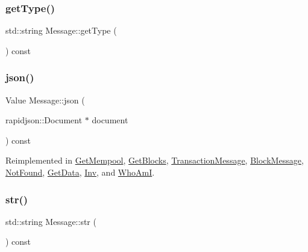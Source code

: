 \subsubsection{\texorpdfstring{get\+Type()}{getType()}}
{\footnotesize\ttfamily std\+::string Message\+::get\+Type (\begin{DoxyParamCaption}{ }\end{DoxyParamCaption}) const}

\mbox{\label{classMessage_a6f8e3ac2eed3a8afe9400fcd5b3447b2}} 
\subsubsection{\texorpdfstring{json()}{json()}}
{\footnotesize\ttfamily Value Message\+::json (\begin{DoxyParamCaption}\item[{rapidjson\+::\+Document $\ast$}]{document }\end{DoxyParamCaption}) const\hspace{0.3cm}{\ttfamily [virtual]}}



Reimplemented in \mbox{\hyperlink{classGetMempool_a3e6fb495c609ade4e8efd3d5668c28cf}{Get\+Mempool}}, \mbox{\hyperlink{classGetBlocks_a8b77916e999ba0a730e31b90b4733928}{Get\+Blocks}}, \mbox{\hyperlink{classTransactionMessage_af8675087bd26b6aa0c30a3e3141dda4e}{Transaction\+Message}}, \mbox{\hyperlink{classBlockMessage_afe33ddfdae83a25d98dd28541bc2fcfe}{Block\+Message}}, \mbox{\hyperlink{classNotFound_a67ee661e6a87c681d167da585c106240}{Not\+Found}}, \mbox{\hyperlink{classGetData_a2fb121264fc1c5821e769f4f2389c6ff}{Get\+Data}}, \mbox{\hyperlink{classInv_a815854f9808009dbf9f0fdb1159061c5}{Inv}}, and \mbox{\hyperlink{classWhoAmI_a998c4b21d6235a84f15bd994b76be59d}{Who\+AmI}}.

\mbox{\label{classMessage_afde1ad2efd7e7af3ed65bbbb08e2e172}} 
\subsubsection{\texorpdfstring{str()}{str()}}
{\footnotesize\ttfamily std\+::string Message\+::str (\begin{DoxyParamCaption}{ }\end{DoxyParamCaption}) const}



